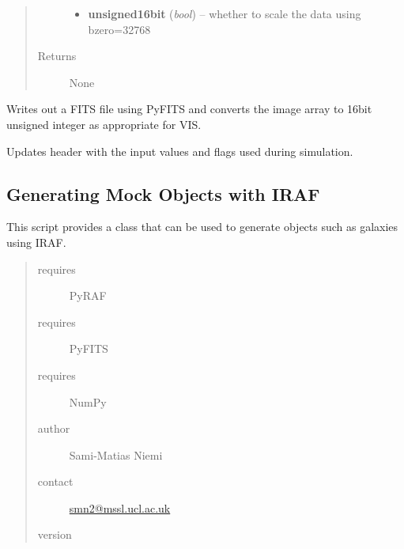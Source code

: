 \documentclass[a4paper,12pt,english]{sphinxmanual}
\begin{document}
\begin{fulllineitems}
\begin{fulllineitems}
\begin{quote}
\begin{description}
\begin{itemize}
\item {} 
\textbf{unsigned16bit} (\emph{bool}) -- whether to scale the data using bzero=32768

\end{itemize}

\item[{Returns}] \leavevmode
None

\end{description}\end{quote}

\end{fulllineitems}


\begin{fulllineitems}
\label{simulator:simulator.simulator.VISsimulator.writeOutputs}
Writes out a FITS file using PyFITS and converts the image array to 16bit unsigned integer as
appropriate for VIS.

Updates header with the input values and flags used during simulation.

\end{fulllineitems}


\end{fulllineitems}

\label{simulator:module-simulator.generateGalaxies}

\subsection{Generating Mock Objects with IRAF}
\label{simulator:generating-mock-objects-with-iraf}
This script provides a class that can be used to generate objects such as galaxies using IRAF.
\begin{quote}\begin{description}
\item[{requires}] \leavevmode
PyRAF

\item[{requires}] \leavevmode
PyFITS

\item[{requires}] \leavevmode
NumPy

\item[{author}] \leavevmode
Sami-Matias Niemi

\item[{contact}] \leavevmode
\href{mailto:smn2@mssl.ucl.ac.uk}{smn2@mssl.ucl.ac.uk}

\item[{version}] 

\end{description}\end{quote}
\end{document}
